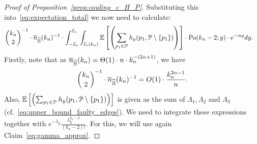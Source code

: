 \begin{proof}[Proof of Proposition~\ref{prop:couling_c_H_P}]
Substituting this into~\eqref{eq:expectation_total} we now need to calculate:
\begin{align*}
&{k_n\choose 2}^{-1}\cdot \expH^{-1} \cdot \int_{-I_n}^{I_n} 
\int_{I_\eps(k_n)} \Exp{\left( \sum_{p_1 \in \Pcal} h_y (p_1, \Pcal \setminus \{ p_1 \})\right)} \cdot 
 \Pop{y}{k_n-2} \cdot e^{-\alpha y} dy.
\end{align*}
Firstly, note that as $\expH = \Theta (1) \cdot n \cdot k_n^{-(2\alpha +1)}$, we have 
$$ {k_n\choose 2}^{-1}\cdot \expH^{-1} = O(1) \cdot \frac{k_n^{2\alpha-1}}{n}.$$
Also, $\Exp{\left( \sum_{p_1 \in \Pcal} h_y (p_1, \Pcal \setminus \{ p_1 \})\right)}$ is given 
as the sum of $\Lambda_1, \Lambda_2$ and $\Lambda_3$ (cf.~\eqref{eq:upper_bound_faulty_edges}). 
We need to integrate these expressions together with $e^{-\lambda_y} \frac{\lambda_y^{k_n-2}}{(k_n-2)!}$.
For this, we will use again Claim~\ref{eq:gamma_approx}.



\end{proof}
